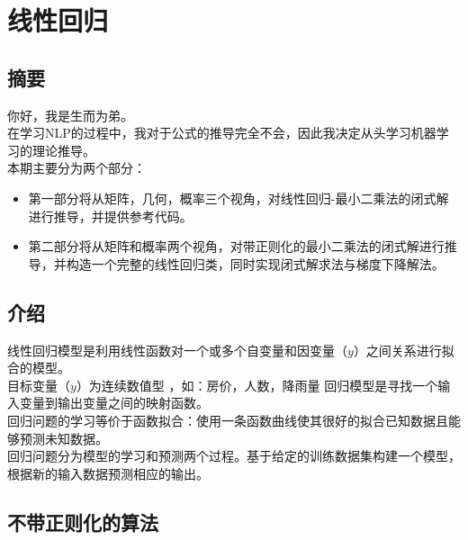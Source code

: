 \documentclass{report}
\begin{document}
\chapter{线性回归}
\section{摘要}
你好，我是生而为弟。\\
在学习NLP的过程中，我对于公式的推导完全不会，因此我决定从头学习机器学习的理论推导。\\
本期主要分为两个部分：
\begin{itemize}
	\item[] 第一部分将从矩阵，几何，概率三个视角，对线性回归-最小二乘法的闭式解进行推导，并提供参考代码。
	\item[] 第二部分将从矩阵和概率两个视角，对带正则化的最小二乘法的闭式解进行推导，并构造一个完整的线性回归类，同时实现闭式解求法与梯度下降解法。
\end{itemize}
\section{介绍}
线性回归模型是利用线性函数对一个或多个自变量和因变量（$y$）之间关系进行拟合的模型。\\
目标变量（$y$）为连续数值型 ，如：房价，人数，降雨量 回归模型是寻找一个输入变量到输出变量之间的映射函数。\\
回归问题的学习等价于函数拟合：使用一条函数曲线使其很好的拟合已知数据且能够预测未知数据。\\
回归问题分为模型的学习和预测两个过程。基于给定的训练数据集构建一个模型，根据新的输入数据预测相应的输出。
\section{不带正则化的算法}
\end{document}
